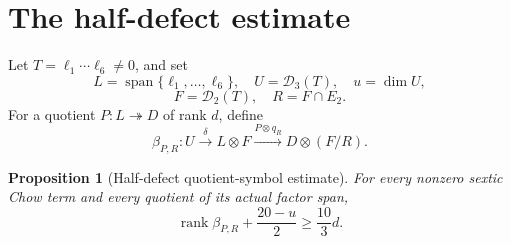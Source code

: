 \documentclass[11pt]{amsart}
\newcommand{\Span}{\operatorname{span}}
\newcommand{\rank}{\operatorname{rank}}
\newcommand{\cD}{\mathcal{D}}
\newtheorem{proposition}[theorem]{Proposition}
\theoremstyle{definition}
\begin{document}
\section{The half-defect estimate}

Let \(T=\ell_1\cdots\ell_6\ne0\), and set
\[
 L=\Span\{\ell_1,\ldots,\ell_6\},\quad
 U=\cD_3(T),\quad u=\dim U,
\]
\[
 F=\cD_2(T),\quad R=F\cap E_2.
\]
For a quotient \(P:L\twoheadrightarrow D\) of rank \(d\), define
\[
 \beta_{P,R}:U\xrightarrow{\delta}L\otimes F
 \xrightarrow{P\otimes q_R}D\otimes(F/R).
\]

\begin{proposition}[Half-defect quotient-symbol estimate]
\label{prop:half-defect}
For every nonzero sextic Chow term and every quotient of its actual factor
span,
\[
 \boxed{\rank\beta_{P,R}+\frac{20-u}{2}\ge\frac{10}{3}d.} \tag{4.1}
\]
\end{proposition}
\end{document}
